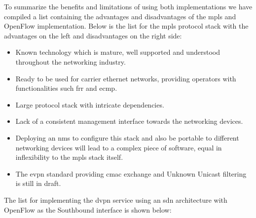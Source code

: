 To summarize the benefits and limitations of using both implementations we have compiled a list containing the advantages and disadvantages of the \ac{mpls} and OpenFlow implementation. Below is the list for the \ac{mpls} protocol stack  with the advantages on the left and disadvantages on the right side:

\vspace{5 mm}

\begin{minipage}[t]{0.5\textwidth}
\begin{itemize}[label=\checkmark]
	\item Known technology which is mature, well supported and understood throughout the networking industry.
	\item Ready to be used for carrier ethernet networks, providing operators with functionalities such \ac{frr} and \ac{ecmp}.
\end{itemize}
\end{minipage}%
\begin{minipage}[t]{0.5\textwidth}
\begin{itemize}[label=$\times$]
	\item Large protocol stack with intricate dependencies.
	\item Lack of a consistent management interface towards the networking devices.
	\item Deploying an \ac{nms} to configure this stack and also be portable to different networking devices will lead to a complex piece of software, equal in inflexibility to the \ac{mpls} stack itself.
	\item The \ac{evpn} standard providing \ac{cmac} exchange and Unknown Unicast filtering is still in draft.
\end{itemize}
\end{minipage}

\clearpage
The list for implementing the \ac{dvpn} service using an \ac{sdn} architecture with OpenFlow as the Southbound interface is shown below:

\vspace{5 mm}

